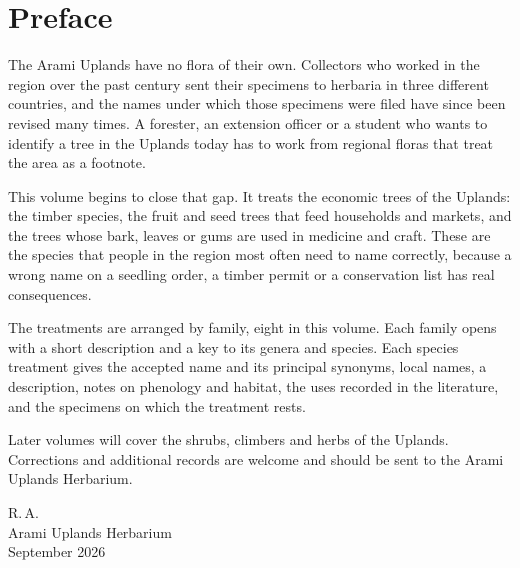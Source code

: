 \chapter{Preface}

The Arami Uplands have no flora of their own. Collectors who worked in
the region over the past century sent their specimens to herbaria in
three different countries, and the names under which those specimens
were filed have since been revised many times. A forester, an
extension officer or a student who wants to identify a tree in the
Uplands today has to work from regional floras that treat the area as
a footnote.

This volume begins to close that gap. It treats the economic trees of
the Uplands: the timber species, the fruit and seed trees that feed
households and markets, and the trees whose bark, leaves or gums are
used in medicine and craft. These are the species that people in the
region most often need to name correctly, because a wrong name on a
seedling order, a timber permit or a conservation list has real
consequences.

The treatments are arranged by family, eight in this volume. Each
family opens with a short description and a key to its genera and
species. Each species treatment gives the accepted name and its
principal synonyms, local names, a description, notes on phenology and
habitat, the uses recorded in the literature, and the specimens on
which the treatment rests.

Later volumes will cover the shrubs, climbers and herbs of the
Uplands. Corrections and additional records are welcome and should be
sent to the Arami Uplands Herbarium.

\bigskip
\noindent R.\,A.\\
Arami Uplands Herbarium\\
September 2026